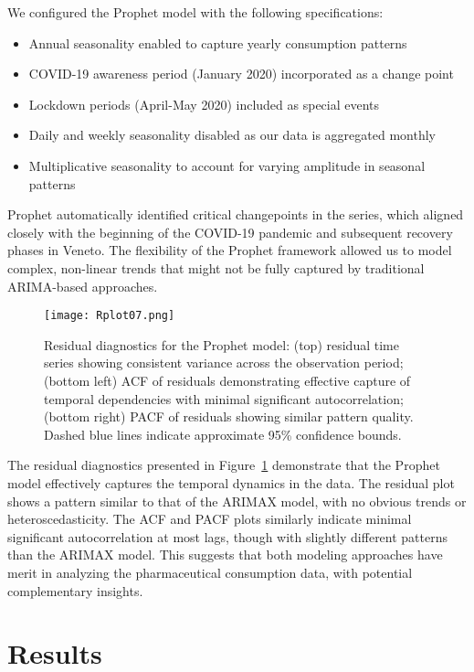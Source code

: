 \documentclass[10pt]{article}
\begin{document}
We configured the Prophet model with the following specifications:
\begin{itemize}
    \item Annual seasonality enabled to capture yearly consumption patterns
    \item COVID-19 awareness period (January 2020) incorporated as a change point
    \item Lockdown periods (April-May 2020) included as special events
    \item Daily and weekly seasonality disabled as our data is aggregated monthly
    \item Multiplicative seasonality to account for varying amplitude in seasonal patterns
\end{itemize}

Prophet automatically identified critical changepoints in the series, which aligned closely with the beginning of the COVID-19 pandemic and subsequent recovery phases in Veneto. The flexibility of the Prophet framework allowed us to model complex, non-linear trends that might not be fully captured by traditional ARIMA-based approaches.

\begin{figure}[ht]
\centering
\texttt{[image: Rplot07.png]}
\caption{Residual diagnostics for the Prophet model: (top) residual time series showing consistent variance across the observation period; (bottom left) ACF of residuals demonstrating effective capture of temporal dependencies with minimal significant autocorrelation; (bottom right) PACF of residuals showing similar pattern quality. Dashed blue lines indicate approximate 95\% confidence bounds.}
\label{fig:prophet}
\end{figure}

The residual diagnostics presented in Figure~\ref{fig:prophet} demonstrate that the Prophet model effectively captures the temporal dynamics in the data. The residual plot shows a pattern similar to that of the ARIMAX model, with no obvious trends or heteroscedasticity. The ACF and PACF plots similarly indicate minimal significant autocorrelation at most lags, though with slightly different patterns than the ARIMAX model. This suggests that both modeling approaches have merit in analyzing the pharmaceutical consumption data, with potential complementary insights.



\section{Results}
\end{document}
